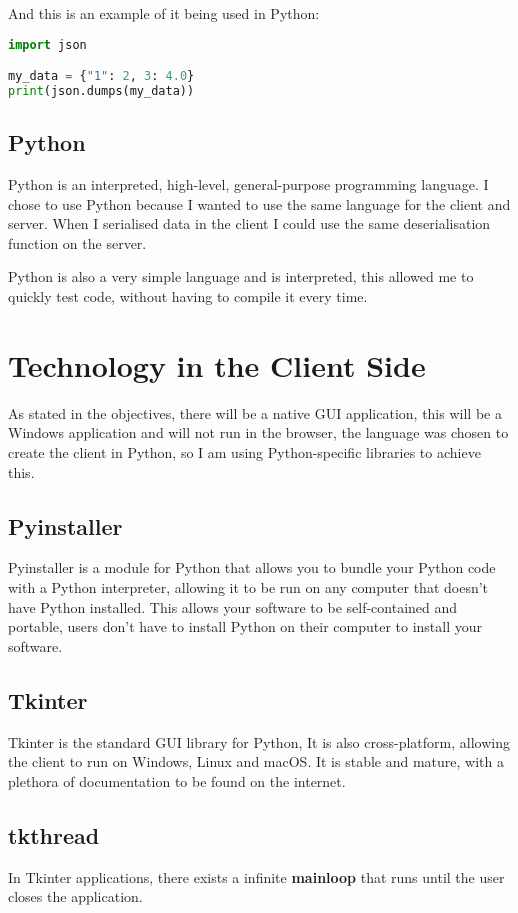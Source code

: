 And this is an example of it being used in Python:

\begin{lstlisting}[language=Python]
import json

my_data = {"1": 2, 3: 4.0}
print(json.dumps(my_data))
\end{lstlisting}

\subsection{Python}
Python is an interpreted, high-level, general-purpose programming language.
I chose to use Python because I wanted to use the same language for the client and server.
When I serialised data in the client I could use the same deserialisation function on the server.

Python is also a very simple language and is interpreted, this allowed me to quickly test code, without having to compile it every time.

\section{Technology in the Client Side}
As stated in the objectives, there will be a native GUI application,
this will be a Windows application and will not run in the browser,
the language was chosen to create the client in Python,
so I am using Python-specific libraries to achieve this.

\subsection{Pyinstaller}
Pyinstaller is a module for Python that allows you to bundle your Python code with a Python interpreter, allowing it to be run on any computer that doesn't have Python installed.
This allows your software to be self-contained and portable, users don't have to install Python on their computer to install your software.

\subsection{Tkinter}
Tkinter is the standard GUI library for Python,
It is also cross-platform, allowing the client to run on Windows, Linux and macOS.
It is stable and mature, with a plethora of documentation to be found on the internet.

\subsection{tkthread}
In Tkinter applications, there exists a infinite \textbf{mainloop}
that runs until the user closes the application.

